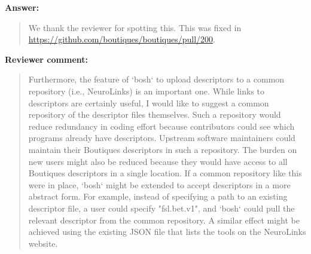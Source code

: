 \documentclass[a4]{article}
\newenvironment{review}%
{\textbf{Reviewer comment:}\begin{quote}}%
{\end{quote}}%
\newenvironment{answer}%
{\textbf{Answer:}\begin{small}\begin{quote}}%
{\end{quote}\end{small}}%
\begin{document}
\begin{answer}
  We thank the reviewer for spotting this. This was fixed in
  \url{https://github.com/boutiques/boutiques/pull/200}.
\end{answer}

\begin{review}
Furthermore, the feature of `bosh` to upload descriptors to a common repository (i.e., NeuroLinks) is an important one. While links to descriptors are certainly useful, I would like to suggest a common repository of the descriptor files themselves. Such a repository would reduce redundancy in coding effort because contributors could see which programs already have descriptors. Upstream software maintainers could maintain their Boutiques descriptors in such a repository. The burden on new users might also be reduced because they would have access to all Boutiques descriptors in a single location. If a common repository like this were in place, `bosh` might be extended to accept descriptors in a more abstract form. For example, instead of specifying a path to an existing descriptor file, a user could specify "fsl.bet.v1", and `bosh` could pull the relevant descriptor from the common repository. A similar effect might be achieved using the existing JSON file that lists the
tools on the NeuroLinks website.
\end{review}
\end{document}
